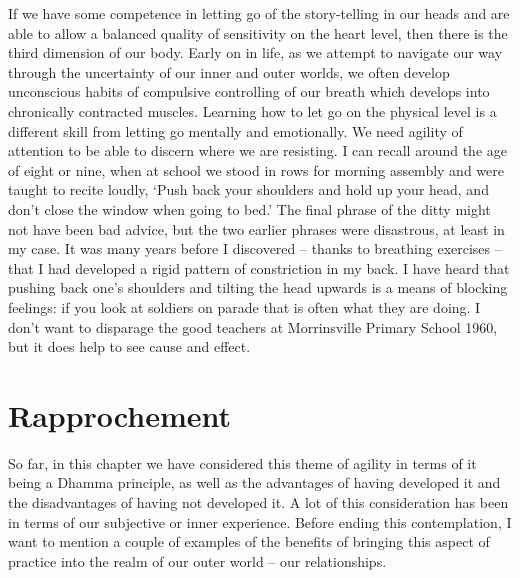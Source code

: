 If we have some competence in letting go of the story-telling in our
heads and are able to allow a balanced quality of sensitivity on the
heart level, then there is the third dimension of our body. Early on in
life, as we attempt to navigate our way through the uncertainty of our
inner and outer worlds, we often develop unconscious habits of
compulsive controlling of our breath which develops into chronically
contracted muscles. Learning how to let go on the physical level is a
different skill from letting go mentally and emotionally. We need
agility of attention to be able to discern where we are resisting. I can
recall around the age of eight or nine, when at school we stood in rows
for morning assembly and were taught to recite loudly, `Push back your
shoulders and hold up your head, and don't close the window when going
to bed.' The final phrase of the ditty might not have been bad advice,
but the two earlier phrases were disastrous, at least in my case. It was
many years before I discovered -- thanks to breathing exercises -- that
I had developed a rigid pattern of constriction in my back. I have heard
that pushing back one's shoulders and tilting the head upwards is a
means of blocking feelings: if you look at soldiers on parade that is
often what they are doing. I don't want to disparage the good teachers
at Morrinsville Primary School 1960, but it does help to see cause and
effect.

\section{Rapprochement}

So far, in this chapter we have considered this theme of agility in
terms of it being a Dhamma principle, as well as the advantages of
having developed it and the disadvantages of having not developed it. A
lot of this consideration has been in terms of our subjective or inner
experience. Before ending this contemplation, I want to mention a couple
of examples of the benefits of bringing this aspect of practice into the
realm of our outer world -- our relationships.

